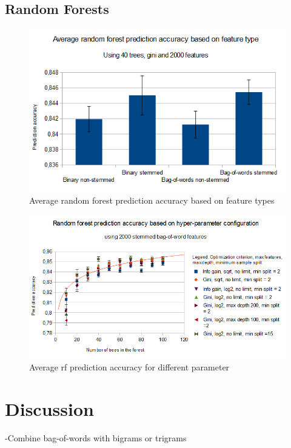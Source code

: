 \documentclass{acm_proc_article-sp}
\begin{document}
\subsection{Random Forests}
\begin{figure} 
\includegraphics[width=1\columnwidth]{images/rf_feature_types.png}  
\caption{Average random forest prediction accuracy based on feature types} \label{fig:r1}
\end{figure}

\begin{figure}
\includegraphics[width=1\columnwidth]{images/rf_parameter.png}  
\caption{Average rf prediction accuracy for different parameter} \label{fig:r2}
\end{figure}

\section{Discussion}
-Combine bag-of-words with bigrams or trigrams
\end{document}
